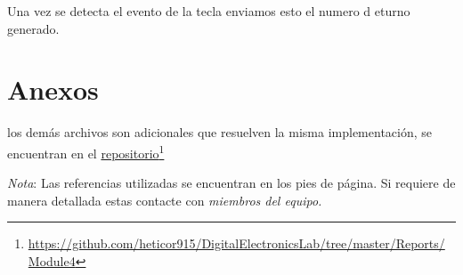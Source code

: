 \documentclass[paper=a4, fontsize=12pt]{article} 		%
\newcommand\fnurl[2]{%
\href{#2}{#1}\footnote{\url{#2}}%
}
\numberwithin{equation}{section}						%
\numberwithin{table}{section} 							%
\begin{document}
Una vez se detecta el evento de la tecla enviamos esto el numero d eturno generado. 

\section{Anexos}
los demás archivos son adicionales que resuelven la misma implementación, se encuentran en el \fnurl{repositorio}{https://github.com/heticor915/DigitalElectronicsLab/tree/master/Reports/Module4}
\textit{Nota}: Las referencias utilizadas se encuentran en los pies de página. Si requiere de manera detallada estas contacte con \emph{miembros del equipo.}
\end{document}
